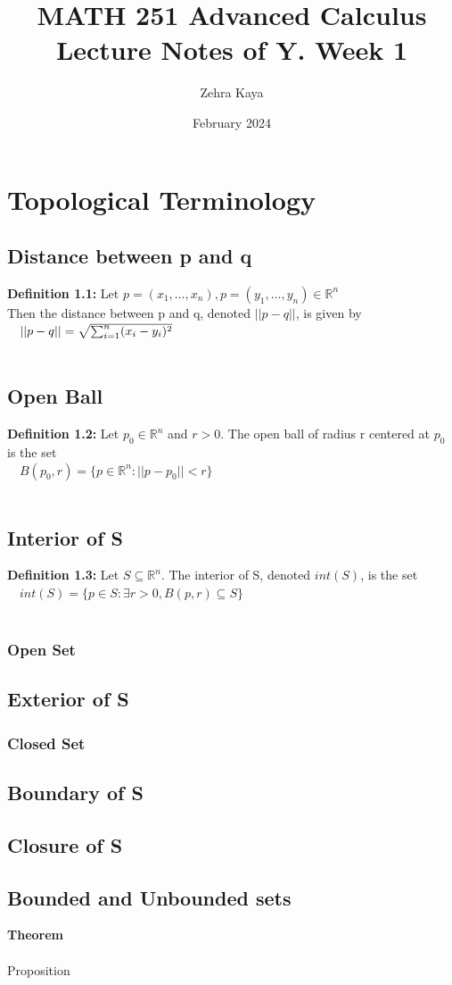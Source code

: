 \documentclass{article}
\title{MATH 251 Advanced Calculus
Lecture Notes of Y. Week 1 }
\author{Zehra Kaya}
\date{February 2024}
\begin{document}
\maketitle
\tableofcontents



\section{Topological Terminology}
\subsection{Distance between p and q}

\textbf{Definition 1.1: } Let $ {p= ( x_1,\dots ,x_n), p= ( y_1,\dots ,y_n)\in \mathbb{R}^n}$ \\

Then the distance between p and q, denoted $||p -q||$, is given by  \\

\ \ ${||p-q|| = \large {\sqrt{{\sum_{i= 1}^{n}} (x_i -y_i)^2}}}$ \\ \\
\subsection{Open Ball}


\textbf{Definition 1.2: } Let $p_0\in \mathbb{R}^n$ and $r>0$. The open ball of radius r centered at $p_0$ is the set \\
\ \ ${B(p_0,r) = \{p\in \mathbb{R}^n : ||p-p_0||< r\}}$ \\ \\
\subsection{ Interior of S}
\textbf{Definition 1.3: } Let $S\subseteq \mathbb{R}^n$. The interior of S, denoted $int(S)$, is the set \\
\ \ ${int(S) = \{p\in S : \exists r>0, B(p,r)\subseteq S\}}$ \\ \\

\subsubsection{Open Set}
\subsection{ Exterior of S}
\subsubsection{Closed Set}
\subsection{ Boundary of S}
\subsection{ Closure of S}
\subsection{ Bounded and Unbounded sets }


\textbf{Theorem } \\ \\


Proposition
\end{document}
